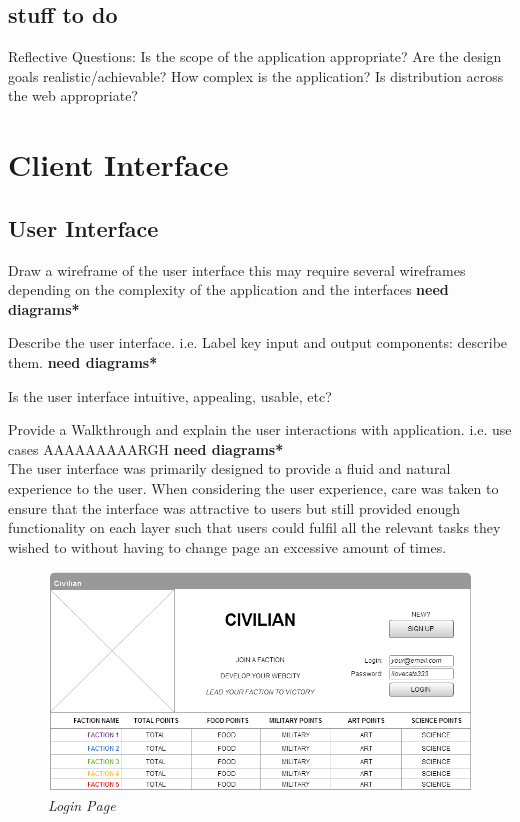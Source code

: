 \documentclass{sig-alt-release2}
\begin{document}
\subsection{stuff to do} 

Reflective Questions: 
Is the scope of the application appropriate? 
Are the design goals realistic/achievable? 
How complex is the application? 
Is distribution across the web appropriate? 

\section{Client Interface}

\subsection{User Interface}

Draw a wireframe of the user interface 
this may require several wireframes depending on the complexity of the application and the interfaces {\bf *need diagrams*} 

Describe the user interface.
i.e. Label key input and output components: describe them. {\bf *need diagrams*} 

Is the user interface intuitive, appealing, usable, etc?

Provide a Walkthrough and explain the user interactions with application. 
i.e. use cases AAAAAAAAARGH {\bf *need diagrams*} \\

The user interface was primarily designed to provide a fluid and natural experience to the user. When considering the user experience, care was taken to ensure that the interface was attractive to users but still provided enough functionality on each layer such that users could fulfil all the relevant tasks they wished to without having to change page an excessive amount of times. \\

\begin{figure}[!htbp]
  \caption{\textit{Login Page}}
  \begin{center}
		\includegraphics[scale=0.25]{img/w3.png}
  \end{center}
\end{figure}
\end{document}
